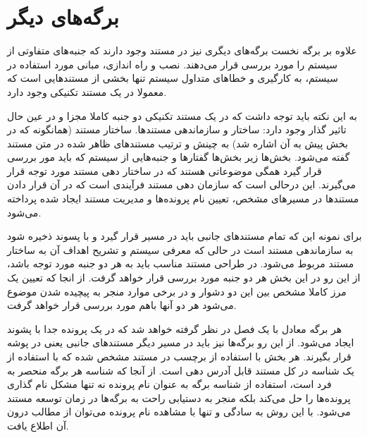 %
% 
% 
% 
%
\section{برگه‌های دیگر}
  علاوه بر برگه نخست برگه‌های دیگری نیز در مستند وجود دارند که جنبه‌های متفاوتی
  از سیستم را مورد بررسی قرار می‌دهند. نصب و راه اندازی، مبانی مورد استفاده در
  سیستم، به کارگیری و خطاهای متداول سیستم تنها بخشی از مستندهایی است که معمولا
  در یک مستند تکنیکی وجود دارد.

  به این نکته باید توجه داشت که در یک مستند تکنیکی دو جنبه کاملا مجزا و در عین حال
  تاثیر گذار وجود دارد: ساختار و سازماندهی مستندها. ساختار
  مستند (همانگونه که در بخش پیش به آن اشاره شد) به چینش و ترتیب مستندهای ظاهر
  شده در متن مستند گفته می‌شود. بخش‌ها زیر بخش‌ها گفتارها و جنبه‌هایی از سیستم که باید 
  مور بررسی قرار گیرد همگی موضوعاتی هستند که در ساختار دهی مستند مورد توجه قرار می‌گیرند.
 این درحالی است که سازمان
  دهی مستند فرآیندی است که در آن قرار دادن مستندها در مسیرهای مشخص، تعیین نام پرونده‌ها و مدیریت
  مستند ایجاد شده پرداخته می‌شود.

  برای نمونه این که تمام مستندهای جانبی باید در مسیر  قرار گیرد و با پسوند
   ذخیره شود به سازماندهی مستند است در حالی که معرفی سیستم و
  تشریح اهداف آن به ساختار مستند مربوط می‌شود.
  در طراحی مستند مناسب باید به هر دو جنبه مورد توجه باشد، از این رو در این بخش هر دو
  جنبه مورد بررسی قرار خواهد گرفت. از انجا که تعیین یک مرز کاملا مشخص بین این
  دو دشوار و در برخی موارد منجر به پیچیده شدن موضوع می‌شود هر دو آنها باهم مورد بررسی قرار خواهد گرفت.

  هر برگه معادل با یک فصل در نظر گرفته خواهد شد که در یک پرونده جدا با پشوند
   ایجاد می‌شود. از این رو برگه‌ها نیز باید در مسیر دیگر مستندهای
  جانبی یعنی در پوشه  قرار بگیرند.
  هر بخش با استفاده از برچسب  در مستند مشخص شده که با استفاده از یک
  شناسه در کل مستند قابل آدرس دهی است.
  از آنجا که شناسه هر برگه منحصر به فرد است، استفاده از شناسه برگه به عنوان نام
  پرونده نه تنها مشکل نام گذاری پرونده‌ها را حل می‌کند بلکه منجر به دستیابی راحت
  به برگه‌ها در زمان توسعه مستند می‌شود. با این روش به سادگی و تنها با مشاهده
  نام پرونده می‌توان از مطالب درون آن اطلاع یافت.

